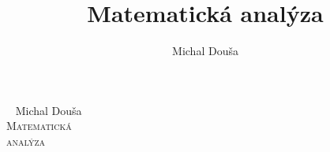 \documentclass[b5paper]{book}
\title{Matematická analýza}
\author{Michal Douša}
\date{}
\begin{document}
    \begin{titlepage}
        \raggedleft
        {\ }
        \vfill
        {\Large Michal Douša}
        \\[1cm]
        {\Huge \scshape Matematická\\analýza}
        \vfill
    \end{titlepage}
    \tableofcontents
    
    
    
    
    
    
    
    
    \listoffigures
    
\end{document}
